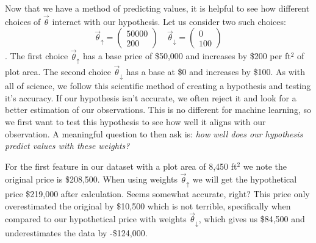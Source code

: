 Now that we have a method of predicting values, it is helpful to see how different choices of $\vec\theta$ interact with our hypothesis. Let us consider two such choices:
\begin{equation*}
	\vec\theta_{\uparrow} = \begin{pmatrix}50000 \\ 200\end{pmatrix} \quad 	\vec\theta_{\downarrow} = \begin{pmatrix}0 \\ 100\end{pmatrix}
\end{equation*}
. The first choice $\vec\theta_{\uparrow}$ has a base price of \$50,000 and increases by \$200 per ft$^2$ of plot area. The second choice $\vec\theta_{\downarrow}$ has a base at \$0 and increases by \$100. As with all of science, we follow this scientific method of creating a hypothesis and testing it's accuracy. If our hypothesis isn't accurate, we often reject it and look for a better estimation of our observations. This is no different for machine learning, so we first want to test this hypothesis to see how well it aligns with our observation. A meaningful question to then ask is: \emph{how well does our hypothesis predict values with these weights?}

For the first feature in our dataset with a plot area of 8,450 ft$^2$ we note the original price is \$208,500. When using weights $\vec\theta_{\uparrow}$ we will get the hypothetical price \$219,000 after calculation. Seems somewhat accurate, right? This price only overestimated the original by \$10,500 which is not terrible, specifically when compared to our hypothetical price  with weights $\vec\theta_{\downarrow}$, which gives us \$84,500 and underestimates the data by -\$124,000.

